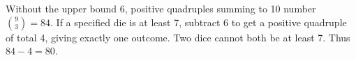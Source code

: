 Without the upper bound 6, positive quadruples summing to 10 number $\binom93=84$. If a specified die is at least 7, subtract 6 to get a positive quadruple of total 4, giving exactly one outcome. Two dice cannot both be at least 7. Thus $84-4=\boxed{80}$.
